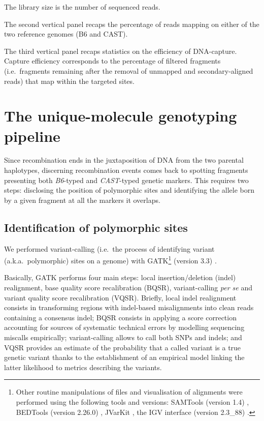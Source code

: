 \begin{sidewaystable}[p]
{		The library size is the number of sequenced reads.
		\par The second vertical panel recaps the percentage of reads mapping on either of the two reference genomes (B6 and CAST).
		\par The third vertical panel recaps statistics on the efficiency of DNA-capture.
		Capture efficiency corresponds to the percentage of filtered fragments (i.e.\ fragments remaining after the removal of unmapped and secondary-aligned reads) that map within the targeted sites.
	}
\label{tab:characteristics-seq-mapping-capture}
\end{sidewaystable}





\section{The unique-molecule genotyping pipeline}
\label{sec:pipeline}

Since recombination ends in the juxtaposition of DNA from the two parental haplotypes, discerning recombination events comes back to spotting fragments presenting both \textit{B6}-typed and \textit{CAST}-typed genetic markers.
This requires two steps: disclosing the position of polymorphic sites and identifying the allele born by a given fragment at all the markers it overlaps.


\subsection{Identification of polymorphic sites}

We performed variant-calling (i.e.\ the process of identifying variant (a.k.a.\ polymorphic) sites on a genome) with GATK\footnote{Other routine manipulations of files and visualisation of alignments were performed using the following tools and versions: SAMTools (version 1.4) \citep{li2009sequence}, BEDTools (version 2.26.0) \citep{quinlan2010bedtools}, JVarKit \citep{lindenbaum2015jvarkit}, the IGV interface (version 2.3\_88) \citep{robinson2011integrative}.} (version 3.3) \citep{mckenna2010genome}.

Basically, GATK performs four main steps: local insertion/deletion (indel) realignment, base quality score recalibration (BQSR), variant-calling \textit{per se} and variant quality score recalibration (VQSR).
Briefly, local indel realignment consists in transforming regions with indel-based misalignments into clean reads containing a consensus indel; BQSR consists in applying a score correction accounting for sources of systematic technical errors by modelling sequencing miscalls empirically; variant-calling allows to call both SNPs and indels; and VQSR provides an estimate of the probability that a called variant is a true genetic variant thanks to the establishment of an empirical model linking the latter likelihood to metrics describing the variants.\\

